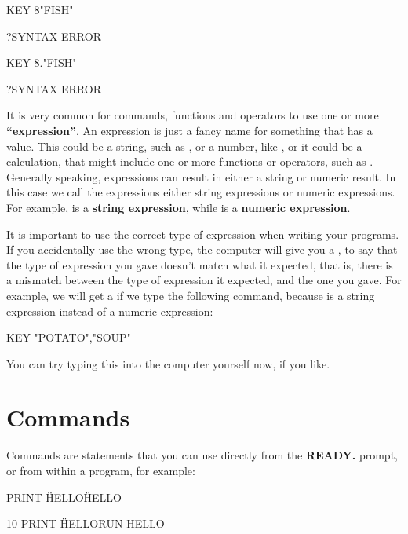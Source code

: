 \begin{screenoutput}
  KEY 8"FISH"

  ?SYNTAX ERROR

  KEY 8."FISH"

  ?SYNTAX ERROR
\end{screenoutput}

It is very common for commands, functions and operators to use one or more {\bf``expression''}.
An expression is just a fancy name for something that has a value.
This could be a string, such as , or a number, like , or it could be a calculation, that might include
one or more functions or operators, such as .
Generally speaking, expressions can result in either a string or numeric result.
In this case we call the expressions either string expressions or numeric expressions.
For example,  is a {\bf string expression}, while  is a {\bf numeric expression}.

It is important to use the correct type of expression when writing your programs.
If you accidentally use the wrong type, the computer will give you a , to say that the type
of expression you gave doesn't match what it expected, that is, there is a mismatch between the type of expression
it expected, and the one you gave.  For example, we will get a  if we type the following command,
because  is a string expression instead of a numeric expression:

\begin{screenoutput}
  KEY "POTATO","SOUP"
\end{screenoutput}

You can try typing this into the computer yourself now, if you like.


\section{Commands}

Commands are statements that you can use directly from the {\bf READY.} prompt, or from within a program, for example:

\begin{screenoutput}
  PRINT \"HELLO\"
  HELLO

  10 PRINT \"HELLO\"
  RUN
  HELLO
\end{screenoutput}


